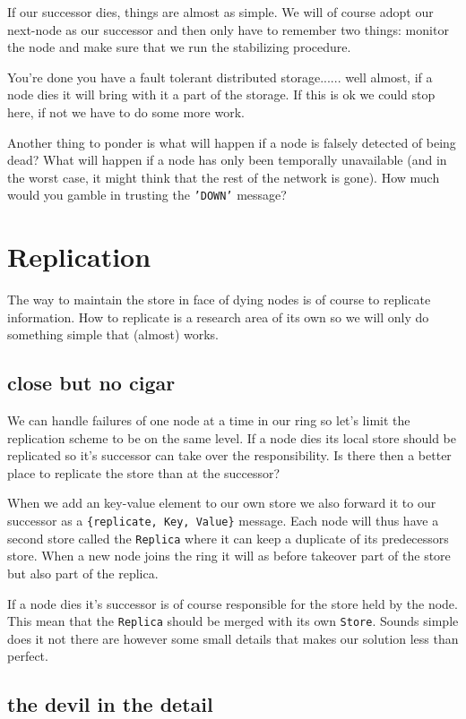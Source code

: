 \documentclass[a4paper,11pt]{article}
\begin{document}
If our successor dies, things are almost as simple. We will of course
adopt our next-node as our successor and then only have to remember two
things: monitor the node and make sure that we run the stabilizing
procedure.

You're done you have a fault tolerant distributed storage...... well
almost, if a node dies it will bring with it a part of the storage. If
this is ok we could stop here, if not we have to do some more work.

Another thing to ponder is what will happen if a node is falsely
detected of being dead? What will happen if a node has only been
temporally unavailable (and in the worst case, it might think that the
rest of the network is gone). How much would you gamble in trusting
the {\tt 'DOWN'} message?


\section{Replication}

The way to maintain the store in face of dying nodes is of course to
replicate information. How to replicate is a research area of its own
so we will only do something simple that (almost) works. 

\subsection{close but no cigar}

We can handle failures of one node at a time in our ring so let's
limit the replication scheme to be on the same level. If a node dies
its local store should be replicated so it's successor can take over the
responsibility. Is there then a better place to replicate the store
than at the successor?

When we add an key-value element to our own store we also forward it
to our successor as a {\tt \{replicate, Key, Value\}} message. Each
node will thus have a second store called the {\tt Replica} where it
can keep a duplicate of its predecessors store. When a new node joins
the ring it will as before takeover part of the store but also part of
the replica.

If a node dies it's successor is of course responsible for the store
held by the node. This mean that the {\tt Replica} should be merged
with its own {\tt Store}. Sounds simple does it not there are however
some small details that makes our solution less than perfect. 

\subsection{the devil in the detail}
\end{document}

